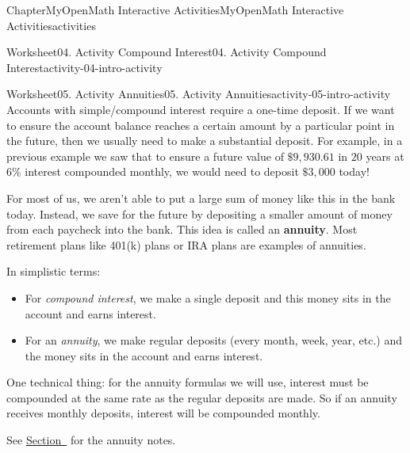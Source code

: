 \documentclass[oneside,10pt,]{book}
\newcommand{\blocktitlefont}{\relax}
\newcommand{\ptxlistdisc}{\raisebox{0.3ex}{\textbullet}}
\newcommand{\terminology}[1]{\textbf{#1}}
\newlength{\fillinmaxwidth}
\newlength{\fillincontract}
\newlength{\charmaxwidth}\setlength{\charmaxwidth}{0.5em}
\newlength{\charminwidth}\setlength{\charminwidth}{0.1em}
\newlength{\fillinheight}
\newcommand{\fillintext}[1]{%
\setlength{\fillinmaxwidth}{#1\charmaxwidth}%
\setlength{\fillincontract}{#1\charminwidth}%
\setlength{\fillinheight}{\baselineskip}\addtolength{\fillinheight}{1.2pt}%
\strut\nobreak\leaders\vbox{\hrule width 0.3pt height 0.3pt \vskip -1.2pt}\hskip 1\fillinmaxwidth minus \fillincontract\nobreak\strut%
}
\begin{document}
\begin{chapterptx}{Chapter}{MyOpenMath Interactive Activities}{}{MyOpenMath Interactive Activities}{}{}{activities}
\begin{worksheet-section}{Worksheet}{04. Activity Compound Interest}{}{04. Activity Compound Interest}{}{}{activity-04-intro-activity}
%
\end{worksheet-section}
\restoregeometry
%
%
\typeout{************************************************}
\typeout{************************************************}
%
\begin{worksheet-section}{Worksheet}{05. Activity Annuities}{}{05. Activity Annuities}{}{}{activity-05-intro-activity}
Accounts with simple\slash{}compound interest require a one-time deposit. If we want to ensure the account balance reaches a certain amount by a particular point in the future, then we usually need to make a substantial deposit. For example, in a previous example we saw that to ensure a future value of \(\$9,930.61\) in \(20\) years at \(6\%\) interest compounded monthly, we would need to deposit \(\$3,000\) today!%
 \par
For most of us, we aren’t able to put a large sum of money like this in the bank today. Instead, we save for the future by depositing a smaller amount of money from each paycheck into the bank. This idea is called an \terminology{annuity}. Most retirement plans like 401(k) plans or IRA plans are examples of annuities.%
 \par
In simplistic terms:%
\begin{itemize}[label=\ptxlistdisc]
\item{}For \emph{compound interest}, we make a single deposit and this money sits in the account and earns interest.%
\item{}For an \emph{annuity}, we make regular deposits (every month, week, year, etc.) and the money sits in the account and earns interest.%
\end{itemize}
%
 \par
One technical thing: for the annuity formulas we will use, interest must be compounded at the same rate as the regular deposits are made. So if an annuity receives monthly deposits, interest will be compounded monthly.%
 \par
See \hyperref[notes-Annuities]{Section~} for the annuity notes.%

\end{worksheet-section}
\end{chapterptx}
\end{document}
